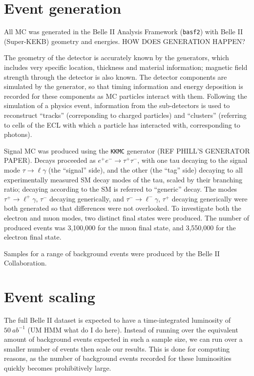 \documentclass[12pt]{thesis}  %
\begin{document}
\section{Event generation}

All MC was generated in the Belle II Analysis Framework (\texttt{basf2}) with Belle II (Super-KEKB) geometry and energies. HOW DOES GENERATION HAPPEN? 

The geometry of the detector is accurately known by the generators, which includes very specific location, thickness and material information; magnetic field strength through the detector is also known. The detector components are simulated by the generator, so that timing information and energy deposition is recorded for these components as MC particles interact with them. Following the simulation of a physics event, information from the sub-detectors is used to reconstruct ``tracks'' (correponding to charged particles) and ``clusters'' (referring to cells of the ECL with which a particle has interacted with, corresponding to photons).

Signal MC was produced using the \texttt{KKMC} generator (REF PHILL'S GENERATOR PAPER). Decays proceeded as $e^+ e^- \to \tau^+ \tau^-$, with one tau decaying to the signal mode $\tau \to \ell \gamma$ (the ``signal'' side), and the other (the ``tag'' side) decaying to all experimentally measured SM decay modes of the tau, scaled by their branching ratio; decaying according to the SM is referred to ``generic'' decay. The modes $\tau^+ \to \ell^+ \gamma$, $\tau^-$ decaying generically, and $\tau^- \to \ell^- \gamma$, $\tau^+$ decaying generically were both generated so that differences were not overlooked. To investigate both the electron and muon modes, two distinct final states were produced. The number of produced events was 3,100,000 for the muon final state, and 3,550,000 for the electron final state.

Samples for a range of background events were produced by the Belle II Collaboration. 


\section{Event scaling}

The full Belle II dataset is expected to have a time-integrated luminosity of $\SI{50}{ab^{-1}}$ (UM HMM what do I do here). Instead of running over the equivalent amount of background events expected in such a sample size, we can run over a smaller number of events then scale our results. This is done for computing reasons, as the number of background events recorded for these luminosities quickly becomes prohibitively large.
\end{document}
